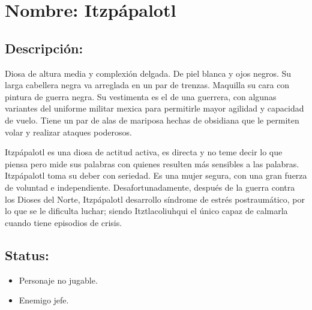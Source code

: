 \section{Nombre: Itzpápalotl}  \label{per:itzpapalotl}
\subsection{Descripción:}
Diosa de altura media y complexión delgada. De piel blanca y ojos negros. Su larga cabellera negra va arreglada en un par de trenzas. Maquilla su cara con pintura de guerra negra. Su vestimenta es el de una guerrera, con algunas variantes del uniforme militar mexica para permitirle mayor agilidad y capacidad de vuelo.  Tiene un par de alas de mariposa hechas de obsidiana que le permiten volar y realizar ataques poderosos.    

Itzpápalotl es una diosa de actitud activa, es directa y no teme decir lo que piensa pero mide sus palabras con quienes resulten más sensibles a las palabras. Itzpápalotl toma su deber con seriedad. Es una mujer segura, con una gran fuerza de voluntad e independiente. Desafortunadamente, después de la guerra contra los Dioses del Norte, Itzpápalotl desarrollo síndrome de estrés postraumático, por lo que se le dificulta luchar; siendo Itztlacoliuhqui  el único capaz de calmarla cuando tiene episodios de crisis.
\subsection{Status:}
	\begin{itemize}
		\item Personaje no jugable.
		\item Enemigo jefe.
	\end{itemize}
